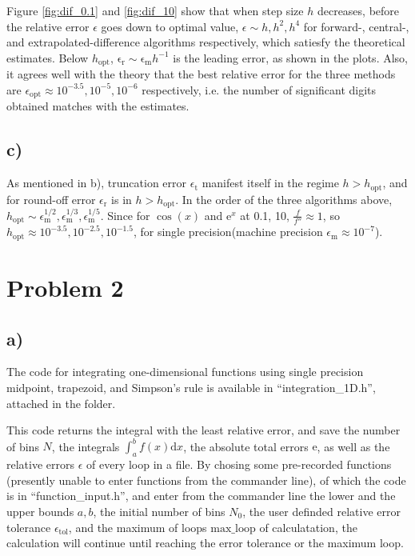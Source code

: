 \documentclass[12pt, graphicx]{article}
\begin{document}
Figure \ref{fig:dif_0.1} and \ref{fig:dif_10} show that when step size $h$ decreases, before the relative error $\epsilon$ goes down to optimal value, $\epsilon\sim h, h^2, h^4$ for forward-, central-, and extrapolated-difference algorithms respectively, which satiesfy the theoretical estimates. Below $h_\mathrm{opt}$, $\mathrm{\epsilon_r}\sim \mathrm{\epsilon_m}h^{-1}$ is the leading error, as shown in the plots. Also, it agrees well with the theory that the best relative error for the three methods are $\epsilon_\mathrm{opt}\approx10^{-3.5}, 10^{-5}, 10^{-6}$ respectively, i.e. the number of significant digits obtained matches with the estimates.

\subsection*{c)}
As mentioned in b), truncation error $\epsilon_\mathrm{t}$ manifest itself in the regime $h>h_\mathrm{opt}$, and for round-off error $\epsilon_\mathrm{r}$ is in $h>h_\mathrm{opt}$. In the order of the three algorithms above, $h_\mathrm{opt}\sim \epsilon_\mathrm{m}^{1/2}, \epsilon_\mathrm{m}^{1/3}, \epsilon_\mathrm{m}^{1/5}$. Since for $\cos(x)$ and $\mathrm{e}^x$ at 0.1, 10, $\frac{f}{f''}\approx 1$, so $h_\mathrm{opt}\approx 10^{-3.5}, 10^{-2.5}, 10^{-1.5}$, for single precision(machine precision $\epsilon_\mathrm{m}\approx 10^{-7}$).


\section*{Problem 2}
\subsection*{a)}
The code for integrating one-dimensional functions using single precision midpoint, trapezoid, and Simpson's rule is available in \textquotedblleft integration\_1D.h\textquotedblright, attached in the folder.\par

This code returns the integral with the least relative error, and save the number of bins $N$, the integrals $\int_a^bf(x)\mathrm{d}x$, the absolute total errors $\mathrm{e}$, as well as the relative errors $\epsilon$ of every loop in a file. By chosing some pre-recorded functions (presently unable to enter functions from the commander line), of which the code is in \textquotedblleft function\_input.h\textquotedblright, and enter from the commander line the lower and the upper bounds $a,b$, the initial number of bins $N_0$, the user definded relative error tolerance $\epsilon_\mathrm{tol}$, and the maximum of loops $\mathrm{max\_loop}$ of calculatation, the calculation will continue until reaching the error tolerance or the maximum loop. \par
\end{document}
